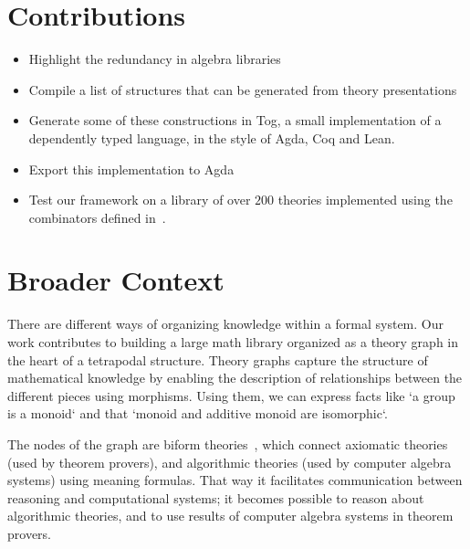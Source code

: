 


\section{Contributions}
\begin{itemize}
    \item Highlight the redundancy in algebra libraries 
    \item Compile a list of structures that can be generated from theory presentations
    \item Generate some of these constructions in Tog, a small implementation of a dependently typed language, in the style of Agda, Coq and Lean. 
    \item Export this implementation to Agda 
    \item Test our framework on a library of over $200$ theories implemented using the combinators defined in~\cite{carette2018building}. 
\end{itemize}  

\section{Broader Context}
\label{sec:broader_context}
There are different ways of organizing knowledge within a formal system. Our work contributes to building a large math library organized as a theory graph in the heart of a tetrapodal structure. Theory graphs capture the structure of mathematical knowledge by enabling the description of relationships between the different pieces using morphisms. Using them, we can express facts like `a group is a monoid` and that `monoid and additive monoid are isomorphic`. 

The nodes of the graph are biform theories~\cite{biformCICM2018}, which connect axiomatic theories (used by theorem provers), and algorithmic theories (used by computer algebra systems) using meaning formulas. That way it facilitates communication between reasoning and computational systems; it becomes possible to reason about algorithmic theories, and to use results of computer algebra systems in theorem provers. 

